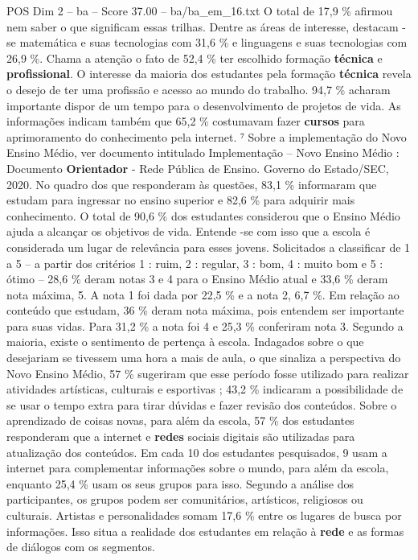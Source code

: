 \begin{textsample}{POS Dim 2 – ba – Score 37.00 – ba/ba\_em\_16.txt}
O total de 17,9 \% afirmou nem saber o que significam essas trilhas.
Dentre as áreas de interesse, destacam -se matemática e suas tecnologias com 31,6 \% e linguagens e suas tecnologias com 26,9 \%.
Chama a atenção o fato de 52,4 \% ter escolhido formação \textbf{técnica} e \textbf{profissional}.
O interesse da maioria dos estudantes pela formação \textbf{técnica} revela o desejo de ter uma profissão e acesso ao mundo do trabalho. 94,7 \% acharam importante dispor de um tempo para o desenvolvimento de projetos de vida.
As informações indicam também que 65,2 \% costumavam fazer \textbf{cursos} para aprimoramento do conhecimento pela internet. ⁷ Sobre a implementação do Novo Ensino Médio, ver documento intitulado Implementação – Novo Ensino Médio : Documento \textbf{Orientador} - Rede Pública de Ensino.
Governo do Estado/SEC, 2020.
No quadro dos que responderam às questões, 83,1 \% informaram que estudam para ingressar no ensino superior e 82,6 \% para adquirir mais conhecimento.
O total de 90,6 \% dos estudantes considerou que o Ensino Médio ajuda a alcançar os objetivos de vida.
Entende -se com isso que a escola é considerada um lugar de relevância para esses jovens.
Solicitados a classificar de 1 a 5 – a partir dos critérios 1 : ruim, 2 : regular, 3 : bom, 4 : muito bom e 5 : ótimo – 28,6 \% deram notas 3 e 4 para o Ensino Médio atual e 33,6 \% deram nota máxima, 5.
A nota 1 foi dada por 22,5 \% e a nota 2, 6,7 \%.
Em relação ao conteúdo que estudam, 36 \% deram nota máxima, pois entendem ser importante para suas vidas.
Para 31,2 \% a nota foi 4 e 25,3 \% conferiram nota 3.
Segundo a maioria, existe o sentimento de pertença à escola.
Indagados sobre o que desejariam se tivessem uma hora a mais de aula, o que sinaliza a perspectiva do Novo Ensino Médio, 57 \% sugeriram que esse período fosse utilizado para realizar atividades artísticas, culturais e esportivas ; 43,2 \% indicaram a possibilidade de se usar o tempo extra para tirar dúvidas e fazer revisão dos conteúdos.
Sobre o aprendizado de coisas novas, para além da escola, 57 \% dos estudantes responderam que a internet e \textbf{redes} sociais digitais são utilizadas para atualização dos conteúdos.
Em cada 10 dos estudantes pesquisados, 9 usam a internet para complementar informações sobre o mundo, para além da escola, enquanto 25,4 \% usam os seus grupos para isso.
Segundo a análise dos participantes, os grupos podem ser comunitários, artísticos, religiosos ou culturais.
Artistas e personalidades somam 17,6 \% entre os lugares de busca por informações.
Isso situa a realidade dos estudantes em relação à \textbf{rede} e as formas de diálogos com os segmentos.

\end{textsample}
